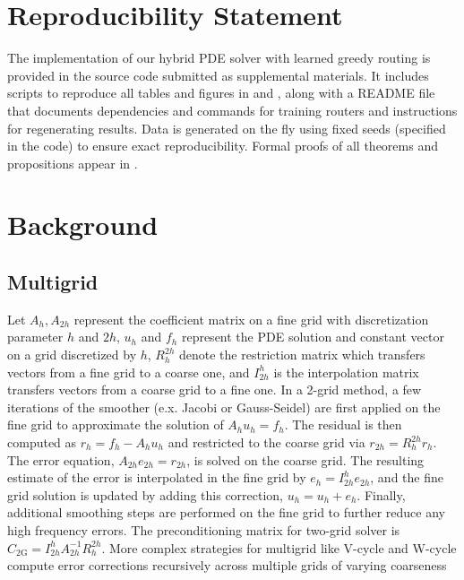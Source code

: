 \documentclass{article} %
\begin{document}
\section*{Reproducibility Statement}

The implementation of our hybrid PDE solver with learned greedy routing is provided in the source code submitted as supplemental materials. It includes scripts to reproduce all tables and figures in  and , along with a README file that documents dependencies and commands for training routers and instructions for regenerating results. Data is generated on the fly using fixed seeds (specified in the code) to ensure exact reproducibility. Formal proofs of all theorems and propositions appear in .




\appendix
\section{Background} \label{sec:appbackground}

\subsection{Multigrid} \label{sec:multigrid}

Let $A_h, A_{2h}$ represent the coefficient matrix on a fine grid with discretization parameter $h$ and $2h$, $u_h$ and $f_h$ represent the PDE solution and constant vector on a grid discretized by $h$, $R^{2h}_h$ denote the restriction matrix which transfers vectors from a fine grid to a coarse one, and $I^{h}_{2h}$ is the interpolation matrix transfers vectors from a coarse grid to a fine one. In a 2-grid method, a few iterations of the smoother (e.x. Jacobi or Gauss-Seidel) are first applied on the fine grid to approximate the solution of $A_hu_h = f_h$. The residual is then computed as $r_h = f_h - A_hu_h$ and restricted to the coarse grid via $r_{2h} = R^{2h}_hr_h$. The error equation, $A_{2h}e_{2h} = r_{2h}$, is solved on the coarse grid. The resulting estimate of the error is interpolated in the fine grid by $e_h = I^{h}_{2h}e_{2h}$, and the fine grid solution is updated by adding this correction, $u_h = u_h + e_h$. Finally, additional smoothing steps are performed on the fine grid to further reduce any high frequency errors. The preconditioning matrix for two-grid solver is $C_\mathrm{2G} = I^{h}_{2h}A_{2h}^{-1}R^{2h}_h$. More complex strategies for multigrid like V-cycle and W-cycle compute error corrections recursively across multiple grids of varying coarseness %
\end{document}
